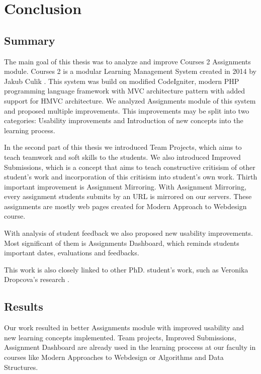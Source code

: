 \chapter*{Conclusion}

\section*{Summary}

The main goal of this thesis was to analyze and improve Courses 2 Assignments module. Courses 2 is a modular Learning Management System created in 2014 by Jakub Culik \cite{culik}. This system was build on modified CodeIgniter, modern PHP programming language framework with MVC architecture pattern with added support for HMVC architecture. We analyzed Assignments module of this system and proposed multiple improvements. This improvements may be split into two categories: Usability improvements and Introduction of new concepts into the learning process.

In the second part of this thesis we introduced Team Projects, which aims to teach teamwork and soft skills to the students. We also introduced Improved Submissions, which is a concept that aims to teach constructive critisism of other student's work and incorporation of this critisism into student's own work. Thirth important improvement is Assignment Mirroring. With Assignment Mirroring, every assignment students submits by an URL is mirrored on our servers. These assignments are mostly web pages created for Modern Approach to Webdesign course.


With analysis of student feedback we also proposed new usability improvements. Most significant of them is Assignments Dashboard, which reminds students important dates, evaluations and feedbacks.

This work is also closely linked to other PhD. student's work, such as Veronika Dropcova's research \cite{dropcova}.

\section*{Results}
Our work resulted in better Assignments module with improved usability and new learning concepts implemented. Team projects, Improved Submissions, Assignment Dashboard are already used in the learning proccess at our faculty in courses like Modern Approaches to Webdesign or Algorithms and Data Structures.

